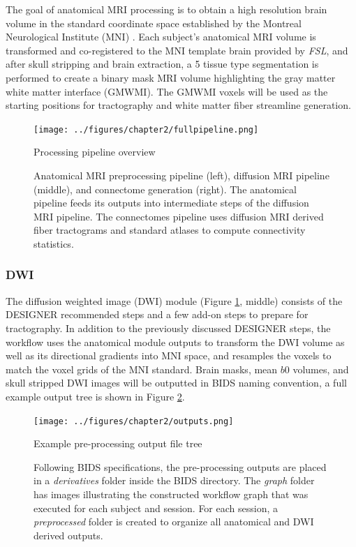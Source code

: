 The goal of anatomical MRI processing is to obtain a high resolution brain volume in the standard coordinate space established by the Montreal Neurological Institute (MNI) \cite{brett_problem_2002}. Each subject's anatomical MRI volume is transformed and co-registered to the MNI template brain provided by \emph{FSL}, and after skull stripping and brain extraction, a 5 tissue type segmentation is performed \cite{patenaude_bayesian_2011} to create a binary mask MRI volume highlighting the gray matter white matter interface (GMWMI). The GMWMI voxels will be used as the starting positions for tractography and white matter fiber streamline generation.

\begin{figure}[htbp]
    \centering
    \texttt{[image: ../figures/chapter2/fullpipeline.png]}
    \caption{Processing pipeline overview}
    \caption*{Anatomical MRI preprocessing pipeline (left), diffusion MRI pipeline (middle), and connectome generation (right). The anatomical pipeline feeds its outputs into intermediate steps of the diffusion MRI pipeline. The connectomes pipeline uses diffusion MRI derived fiber tractograms and standard atlases to compute connectivity statistics.}
    \label{fig:pipeline}
\end{figure}

\subsubsection{DWI}
The diffusion weighted image (DWI) module (Figure \ref{fig:pipeline}, middle) consists of the DESIGNER recommended steps and a few add-on steps to prepare for tractography. In addition to the previously discussed DESIGNER steps, the workflow uses the anatomical module outputs to transform the DWI volume as well as its directional gradients into MNI space, and resamples the voxels to match the voxel grids of the MNI standard. Brain masks, mean $b0$ volumes, and skull stripped DWI images will be outputted in BIDS naming convention, a full example output tree is shown in Figure \ref{fig:outputs}.

\begin{figure}[htbp]
    \centering
    \texttt{[image: ../figures/chapter2/outputs.png]}
    \caption{Example pre-processing output file tree}
    \caption*{Following BIDS specifications, the pre-processing outputs are placed in a \emph{derivatives} folder inside the BIDS directory. The \emph{graph} folder has images illustrating the constructed workflow graph that was executed for each subject and session. For each session, a \emph{preprocessed} folder is created to organize all anatomical and DWI derived outputs.}
    \label{fig:outputs}
\end{figure}

